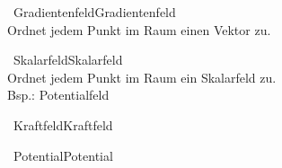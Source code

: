 		 \label{sec:undef_theo}
		\begin{proposition}{\currentboxsection \ Gradientenfeld}{Gradientenfeld} \label{gradientenfeld}  \\
			Ordnet jedem Punkt im Raum einen Vektor zu.
		\end{proposition}
		
		\begin{proposition}{\currentboxsection \ Skalarfeld}{Skalarfeld} \label{skalarfeld}  \\
			Ordnet jedem Punkt im Raum ein Skalarfeld zu.\\
			Bsp.: Potentialfeld \label{potentialfled} 
		\end{proposition}
		
		\begin{proposition}{\currentboxsection \ Kraftfeld}{Kraftfeld} \label{kraftfeld}  \\
			
		\end{proposition}
		
		\begin{proposition}{\currentboxsection \ Potential}{Potential} \label{potential}  \\
			
		\end{proposition}
		
		\begin{proposition}{\currentboxsection \ }{} \label{} \index{} \\
			
		\end{proposition}

	
	